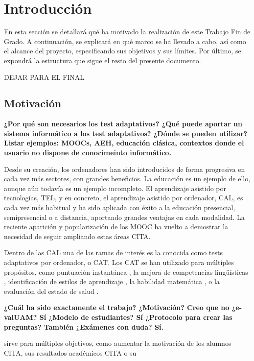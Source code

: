 \chapter{Introducción \label{sec:introduccion}}

En esta sección se detallará qué ha motivado la realización de este Trabajo Fin de Grado. A continuación, se explicará en qué marco se ha llevado a cabo, así como el alcance del proyecto, especificando sus objetivos y sus límites. Por último, se expondrá  la estructura que sigue el resto del presente documento.

DEJAR PARA EL FINAL

\section{Motivación}

\textbf{¿Por qué son necesarios los test adaptativos?
¿Qué puede aportar un sistema informático a los test adaptativos?
¿Dónde se pueden utilizar?
Listar ejemplos: MOOCs, AEH, educación clásica, contextos donde el usuario no dispone de conocimeinto informático.}

Desde su creación, los ordenadores han sido introducidos de forma progresiva en cada vez más sectores, con grandes beneficios. La educación es un ejemplo de ello, aunque aún todavía es un ejemplo incompleto. El aprendizaje asistido por tecnologías, \acrshort{TEL}, y en concreto, el aprendizaje asistido por ordenador, \acrshort{CAL}, 
es cada vez más habitual y ha sido aplicada con éxito a la educación presencial, semipresencial o a distancia, aportando grandes ventajas en cada modalidad. La reciente aparición y popularización de los \acrshort{MOOC} ha vuelto a demostrar la necesidad de seguir ampliando estas áreas {CITA}.

Dentro de las \acrshort{CAL} una de las ramas de interés es la conocida como tests adaptativos por ordenador, o \acrshort{CAT}. Los \acrshort{CAT} se han utilizado para múltiples propósitos, como puntuación instantánea \cite{Wainer00}, la mejora de  competencias lingüísticas \cite{Chapelle06} , identificación de estilos de aprendizaje \cite{Ortigosa10}, la habilidad matemática \cite{Klinkenberg11}, o la evaluación del estado de salud \cite{Revicki97}.

\textbf{¿Cuál ha sido exactamente el trabajo? ¿Motivación? Creo que no ¿e-valUAM? Sí ¿Modelo de estudiantes? Sí ¿Protocolo para crear las preguntas? También ¿Exámenes con duda? Sí.}

 sirve para múltiples objetivos, como aumentar la motivación de los alumnos {CITA}, sus resultados académicos {CITA} o su 

